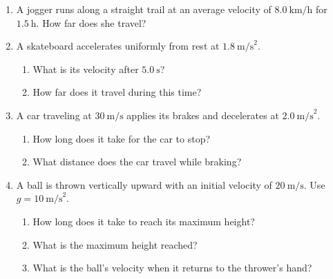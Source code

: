 \documentclass[12pt, twoside]{article}
\begin{document}
\begin{enumerate}[itemsep=1cm]
\newpage
\subsubsection*{Kinematics Equations}

\textbf{Formulas:} \quad $v = v_0 + at$ \quad\quad $d = v_0 t + \frac{1}{2}at^2$ \quad\quad $v^2 = v_0^2 + 2ad$ \quad\quad $d = \frac{1}{2}(v_0 + v)t$

\vspace{1cm}

\item A jogger runs along a straight trail at an average velocity of $8.0~\text{km/h}$ for $1.5~\text{h}$. How far does she travel?
  \vspace{4cm}

\item A skateboard accelerates uniformly from rest at $1.8~\text{m/s}^2$.
  \begin{enumerate}[itemsep=3.5cm]
    \item What is its velocity after $5.0~\text{s}$?
    \item How far does it travel during this time?
  \end{enumerate}
  \vspace{2cm}

\newpage
\item A car traveling at $30~\text{m/s}$ applies its brakes and decelerates at $2.0~\text{m/s}^2$.
  \begin{enumerate}[itemsep=4cm]
    \item How long does it take for the car to stop?
    \item What distance does the car travel while braking?
  \end{enumerate}
  \vspace{2cm}

\item A ball is thrown vertically upward with an initial velocity of $20~\text{m/s}$. Use $g = 10~\text{m/s}^2$.
  \begin{enumerate}[itemsep=4cm]
    \item How long does it take to reach its maximum height?
    \item What is the maximum height reached?
    \item What is the ball's velocity when it returns to the thrower's hand?
  \end{enumerate}

\end{enumerate}
\end{document}

